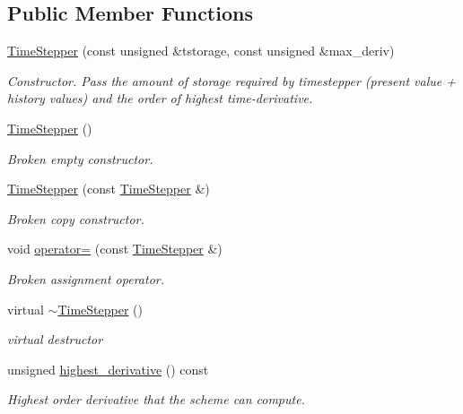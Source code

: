 \subsection*{Public Member Functions}
\begin{DoxyCompactItemize}
\item 
\hyperlink{classoomph_1_1TimeStepper_a8a4f14d18d49b82f0a6ad1c279485cd9}{Time\+Stepper} (const unsigned \&tstorage, const unsigned \&max\+\_\+deriv)
\begin{DoxyCompactList}\small\item\em Constructor. Pass the amount of storage required by timestepper (present value + history values) and the order of highest time-\/derivative. \end{DoxyCompactList}\item 
\hyperlink{classoomph_1_1TimeStepper_a67f21ad40e01e35dd4cbb218aecbf596}{Time\+Stepper} ()
\begin{DoxyCompactList}\small\item\em Broken empty constructor. \end{DoxyCompactList}\item 
\hyperlink{classoomph_1_1TimeStepper_a7aeeb26e2ce471978bf29641c10b3c1b}{Time\+Stepper} (const \hyperlink{classoomph_1_1TimeStepper}{Time\+Stepper} \&)
\begin{DoxyCompactList}\small\item\em Broken copy constructor. \end{DoxyCompactList}\item 
void \hyperlink{classoomph_1_1TimeStepper_af85cc67365648d1bf5270311d460e0ec}{operator=} (const \hyperlink{classoomph_1_1TimeStepper}{Time\+Stepper} \&)
\begin{DoxyCompactList}\small\item\em Broken assignment operator. \end{DoxyCompactList}\item 
virtual \hyperlink{classoomph_1_1TimeStepper_a171b5bbc223c889474ee38fd02eefc4d}{$\sim$\+Time\+Stepper} ()
\begin{DoxyCompactList}\small\item\em virtual destructor \end{DoxyCompactList}\item 
unsigned \hyperlink{classoomph_1_1TimeStepper_aa02483da1254fab8f268d70bb3ef2289}{highest\+\_\+derivative} () const
\begin{DoxyCompactList}\small\item\em Highest order derivative that the scheme can compute. \end{DoxyCompactList}\item 

\end{DoxyCompactItemize}
